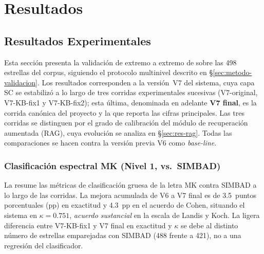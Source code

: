 \section{Resultados}
\label{sec:resultados}

\subsection{Resultados Experimentales}
\label{sec:resultados-exp}

Esta sección presenta la validación de extremo a extremo de \STELLAR{} sobre las
\num{498} estrellas del corpus, siguiendo el protocolo multinivel descrito en
§\ref{sec:metodo-validacion}. Los resultados corresponden a la versión~V7 del
sistema, cuya capa SC se estabilizó a lo largo de tres corridas experimentales
sucesivas (V7-original, V7-KB-fix1 y V7-KB-fix2); esta última, denominada en
adelante \textbf{V7 final}, es la corrida canónica del proyecto y la que reporta
las cifras principales. Las tres corridas se distinguen por el grado de
calibración del módulo de recuperación aumentada (RAG), cuya evolución se analiza
en §\ref{sec:res-rag}. Todas las comparaciones se hacen contra la versión previa
V6 como \textit{base-line}.

\subsubsection{Clasificación espectral MK (Nivel 1, vs.\ SIMBAD)}
\label{sec:res-l1}

La  resume las métricas de clasificación gruesa de la letra
MK contra SIMBAD a lo largo de las corridas. La mejora acumulada de V6 a V7 final
es de \num{+3.5}~puntos porcentuales (pp) en exactitud y \num{+4.3}~pp en el
acuerdo de Cohen, situando el sistema en $\kappa = 0.751$, \emph{acuerdo
sustancial} en la escala de Landis y Koch. La ligera diferencia entre V7-KB-fix1
y V7 final en exactitud y $\kappa$ se debe al distinto número de estrellas
emparejadas con SIMBAD (488 frente a 421), no a una regresión del clasificador.

